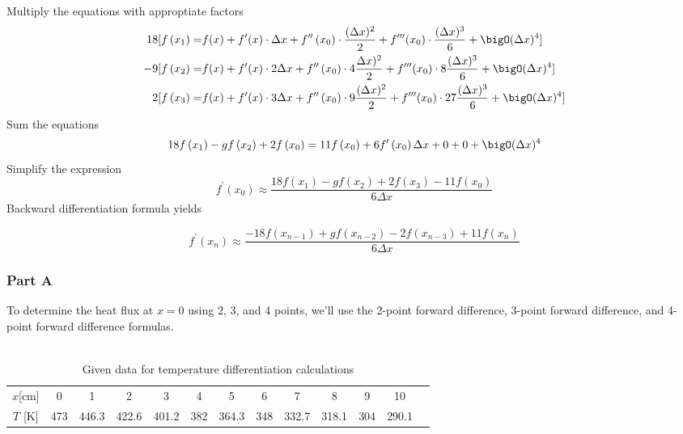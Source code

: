 \documentclass[12pt, a4paper]{article}
\numberwithin{equation}{section}
\begin{document}
Multiply the equations with approptiate factors
\begin{align}
18[f\left(x_{1}\right) =& f(x)+f^{\prime}(x) \cdot \Delta x+f^{\prime \prime}\left(x_{0}\right) \cdot \frac{(\Delta x)^{2}}{2}+f^{\prime \prime \prime}(x_0) \cdot \frac{(\Delta x)^{3}}{6}+\bigO(\Delta x)^{4}] \\
-9[f\left(x_{2}\right) =& f(x)+f^{\prime}(x) \cdot 2 \Delta x+f^{\prime \prime}\left(x_{0}\right) \cdot4 \frac{ \Delta x)^{2}}{2}+f^{\prime \prime \prime}(x_0) \cdot8 \frac{ (\Delta x)^{3}}{6}+\bigO(\Delta x)^{4}] \\
2[f\left(x_{3}\right) =& f(x)+f^{\prime}(x) \cdot 3 \Delta x+f^{\prime \prime}\left(x_{0}\right) \cdot 9\frac{(\Delta x)^{2}}{2}+f^{\prime \prime \prime}(x_0) \cdot 27 \frac{(\Delta x)^{3}}{6}+\bigO(\Delta x)^{4}]
\end{align}
Sum the equations
\begin{equation}
18 f\left(x_{1}\right)-g f\left(x_{2}\right)+2 f\left(x_{0}\right)=11 f\left(x_{0}\right)+6 f^{\prime}\left(x_{0}\right) \Delta x+0+0+\bigO(\Delta x)^{4} 
\end{equation}
Simplify the expression
\begin{equation}
    f^{\prime}\left(x_{0}\right) \approx \frac{18 f\left(x_{1}\right)-g f\left(x_{2}\right)+2 f\left(x_{3}\right)-11 f\left(x_{0}\right)}{6 \Delta x}
\end{equation}
Backward differentiation formula yields

\begin{equation}
    f^{\prime}\left(x_{n}\right) \approx \frac{-18 f\left(x_{n-1}\right)+g f\left(x_{n-2}\right)-2 f\left(x_{n-3}\right)+11 f\left(x_{n}\right)}{6 \Delta x}
\end{equation}

\subsubsection{Part A}

To determine the heat flux at $x = 0$  using 2, 3, and 4 points, we'll use the 2-point forward difference, 3-point forward difference, and 4-point forward difference formulas.\\

\\
\begin{table}[H]
    \centering
    \caption{Given data for temperature differentiation calculations}
    \begin{tabular}{ccccccccccccc} \hline
        $x$[cm] & 0 & 1 & 2 & 3 & 4 & 5 & 6 & 7 & 8 & 9 & 10 \\
        $T$ [K] & 473 & 446.3 & 422.6 & 401.2 & 382 & 364.3 & 348 & 332.7 & 318.1 & 304 & 290.1 \\ \hline
    \end{tabular}
\end{table}
\end{document}
